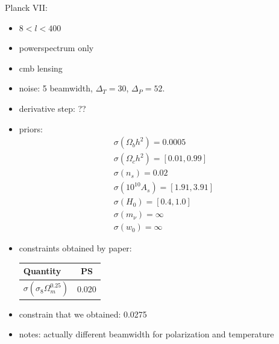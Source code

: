 \documentclass[11pt]{article} %
\begin{document}
Planck VII:
\begin{itemize}
    \item $ 8 < l < 400$
    \item powerspectrum only
    \item cmb lensing
    \item noise: 5 beamwidth, $\Delta_T = 30$, $\Delta_P = 52$.
    \item derivative step: ??
    \item priors:
    \begin{gather*}
        \sigma(\Omega_b h^2) = 0.0005\\
        \sigma(\Omega_c h^2) = [0.01, 0.99]\\
        \sigma(n_s) = 0.02\\
        \sigma(10^10A_s) = [1.91, 3.91]\\
        \sigma(H_0) = [0.4, 1.0]\\
        \sigma(m_\nu) = \infty\\
        \sigma(w_0) = \infty
    \end{gather*}
    \item constraints obtained by paper:
    \begin{table}[h!]
        \centering
        \begin{tabular}{lc}
          \hline
          Quantity & PS  \\
          \hline
          $\sigma(\sigma_8\Omega_m^{0.25})$ & 0.020 \\
          \hline
        \end{tabular}
      \end{table}
      \item constrain that we obtained: 0.0275
      \item notes: actually different beamwidth for polarization and temperature
\end{itemize}
\end{document}
